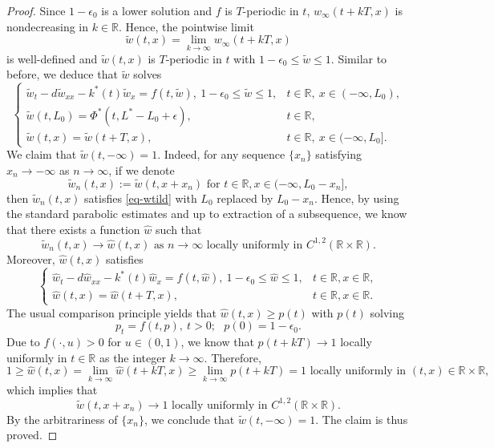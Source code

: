 \documentclass[10pt,a4paper]{amsart}
\begin{document}
\begin{proof}
Since $1-\epsilon_0$ is a  lower solution and $f$  is $T$-periodic in $t$,  $w_\infty(t+kT,x)$ is nondecreasing  in $k\in\mathbb R$. Hence, the pointwise limit
\begin{equation*}
  \tilde{w}(t,x)=\lim_{k\to\infty}w_\infty(t+kT,x)
\end{equation*}
is well-defined and $\tilde{w}(t,x)$ is $T$-periodic  in $t$ with $1-\epsilon_0\leq \tilde{w}\leq 1$.   Similar to before,  we deduce that  $\tilde{w}$ solves
\begin{equation}\label{eq-wtild}
  \begin{cases}
    \tilde{w}_t-d\tilde{w}_{xx}-k^*(t)\tilde{w}_x=f(t,\tilde{w}), ~1-\epsilon_0\leq \tilde{w}\leq 1, &t\in\mathbb R,\  x\in(-\infty,L_0),\\
    \tilde{w}(t,L_0)=\Phi^*(t,L^*-L_0+\epsilon), &t\in\mathbb R,\\
    \tilde{w}(t,x)=\tilde{w}(t+T,x), &t\in\mathbb R,\  x\in(-\infty,L_0].
  \end{cases}
\end{equation}
We claim that $\tilde{w}(t,-\infty)=1$. Indeed, for any sequence $\{x_n\}$  satisfying $x_n\to-\infty$ as $n\to\infty$, if we  denote 
\[\tilde{w}_n(t,x):=\tilde{w}(t,x+x_n) \text{ for } t\in\mathbb{R}, x\in(-\infty, L_0-x_n],\]
then $\tilde{w}_n(t,x)$ satisfies \eqref{eq-wtild} with $L_0$ replaced by $L_0-x_n$. Hence, by using the standard parabolic estimates and up to extraction of a subsequence, we know that there exists a function $\hat{w}$ such that 
\[\tilde{w}_n(t,x)\to\hat{w}(t,x) \text{  as } n\to\infty \text{ locally uniformly in } C^{1, 2}(\mathbb{R}\times\mathbb{R}).\]
Moreover, $\hat{w}(t,x)$ satisfies 
\[ \begin{cases}
  \hat{w}_t-d\hat{w}_{xx}-k^*(t)\hat{w}_x=f(t,\hat{w}), ~1-\epsilon_0\leq \hat{w}\leq 1, &t\in\mathbb R, x\in\mathbb{R},\\
  \hat{w}(t,x)=\hat{w}(t+T,x), &t\in\mathbb R, x\in\mathbb{R}.
\end{cases}
\]
The usual comparison principle yields that $\hat{w}(t,x)\geq p(t)$ with $p(t)$ solving
\[p_t=f(t,p),~t>0;~~~p(0)=1-\epsilon_0.\]
Due to $f(\cdot,u)>0$ for $u\in(0,1)$, we know that $p(t+kT)\to 1$  locally uniformly in $t\in\mathbb{R}$ as the integer $ k\to\infty$. Therefore, 
\[1\geq \hat{w}(t,x)=\lim_{k\to\infty}\hat{w}(t+kT,x)\geq \lim_{k\to\infty}p(t+kT)=1  \text{ locally uniformly in }(t,x)\in\mathbb{R}\times\mathbb R,\]
which implies that 
\[\tilde{w}(t,x+x_n)\to 1   \text{ locally uniformly in } C^{1, 2}(\mathbb{R}\times\mathbb{R}).\]
By the arbitrariness of  $\{x_n\}$, we conclude that $\tilde{w}(t,-\infty)=1$. The claim is thus proved.



\end{proof}
\end{document}

